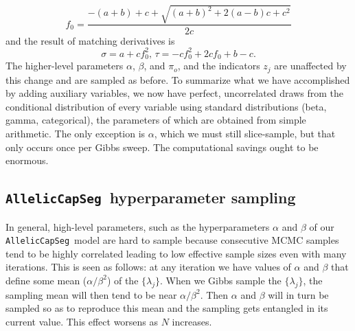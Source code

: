\documentclass[nofootinbib,amssymb,amsmath]{revtex4}
\newcommand{\ACS}{\texttt{AllelicCapSeg}}
\begin{document}
%
\begin{equation}
f_0 = \frac{-(a+b) + c + \sqrt{(a+b)^2 + 2(a-b)c + c^2} }{2c}
\end{equation}
%
and the result of matching derivatives is
\begin{equation}
\sigma = a + c f_0^2, \, \tau = -c f_0^2 + 2 c f_0 + b - c.
\end{equation}
%
The higher-level parameters $\alpha$, $\beta$, and $\pi_o$, and the indicators $z_j$ are unaffected by this change and are sampled as before.  To summarize what we have accomplished by adding auxiliary variables, we now have perfect, uncorrelated draws from the conditional distribution of every variable using standard distributions (beta, gamma, categorical), the parameters of which are obtained from simple arithmetic.  The only exception is $\alpha$, which we must still slice-sample, but that only occurs once per Gibbs sweep.  The computational savings ought to be enormous.

\subsection{\ACS ~hyperparameter sampling} \label{ACS_hyper}
In general, high-level parameters, such as the hyperparameters $\alpha$ and $\beta$ of our \ACS~model are hard to sample because consecutive MCMC samples tend to be highly correlated leading to low effective sample sizes even with many iterations.  This is seen as follows: at any iteration we have values of $\alpha$ and $\beta$ that define some mean ($\alpha/\beta^2$) of the $\{ \lambda_j \}$.  When we Gibbs sample the $\{ \lambda_j \}$, the sampling mean will then tend to be near $\alpha/\beta^2$.  Then $\alpha$ and $\beta$ will in turn be sampled so as to reproduce this mean and the sampling gets entangled in its current value.  This effect worsens as $N$ increases.
\end{document}
